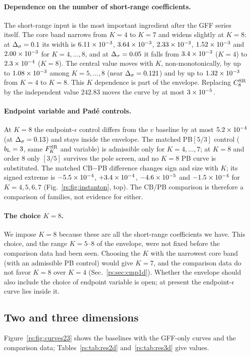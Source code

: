 \paragraph{Dependence on the number of short-range coefficients.} The short-range input is
the most important ingredient after the GFF series itself. The core band narrows from
$K=4$ to $K=7$ and widens slightly at $K=8$: at $\Delta_\sigma=0.1$ its width is $6.11\times10^{-3}$,
$3.64\times10^{-3}$, $2.33\times10^{-3}$, $1.52\times10^{-3}$ and $2.00\times10^{-3}$ for $K=4,\dots,8$,
and at $\Delta_\sigma=0.05$ it falls from $3.4\times10^{-3}$ ($K=4$) to $2.3\times10^{-4}$ ($K=8$). The central value moves with $K$,
non-monotonically, by up to $1.08\times10^{-3}$ among $K=5,\dots,8$ (near $\Delta_\sigma=0.121$) and by up
to $1.32\times10^{-3}$ from $K=4$ to $K=8$. This $K$ dependence is part of the envelope.
Replacing $C^{\mathrm{SR}}_8$ by the independent value $242.83$ moves the curve by at most
$3\times10^{-5}$.

\paragraph{Endpoint variable and Pad\'e controls.} At $K=8$ the endpoint-$\epsilon$ control
differs from the $v$ baseline by at most $5.2\times10^{-4}$ (at $\Delta_\sigma=0.13$) and stays inside the
envelope. The matched PB$[5/3]$ control ($b_{\mathrm L}=3$, same $F^{\rm SR}_K$ and variable) is
admissible only for $K=4,\dots,7$; at $K=8$ and order 8 only $[3/5]$ survives the pole screen, and no
$K=8$ PB curve is substituted. The matched CB$-$PB difference changes sign and size with
$K$; its signed extreme is $-5.5\times10^{-4}$, $+3.4\times10^{-4}$, $-4.6\times10^{-5}$ and
$-1.5\times10^{-4}$ for $K=4,5,6,7$ (Fig.~\ref{rs:fig:instanton}, top). The CB/PB comparison is
therefore a comparison of families, not evidence for either.

\paragraph{The choice $K=8$.} We impose $K=8$ because these are all the short-range
coefficients we have. This choice, and the range $K=5$--$8$ of the envelope, were not fixed
before the comparison data had been seen. Choosing the $K$ with the narrowest core band (with
an admissible PB control) would give $K=7$, and the comparison data do not favor $K=8$ over
$K=4$ (Sec.~\ref{rs:sec:cmp1d}). Whether the envelope should also include the choice of endpoint
variable is open; at present the endpoint-$\epsilon$ curve lies inside it.

\subsection{Two and three dimensions}\label{rs:sec:res23}
Figure~\ref{rs:fig:curves23} shows the baselines with the GFF-only curves and the comparison
data; Tables~\ref{rs:tab:res2d} and~\ref{rs:tab:res3d} give values.


